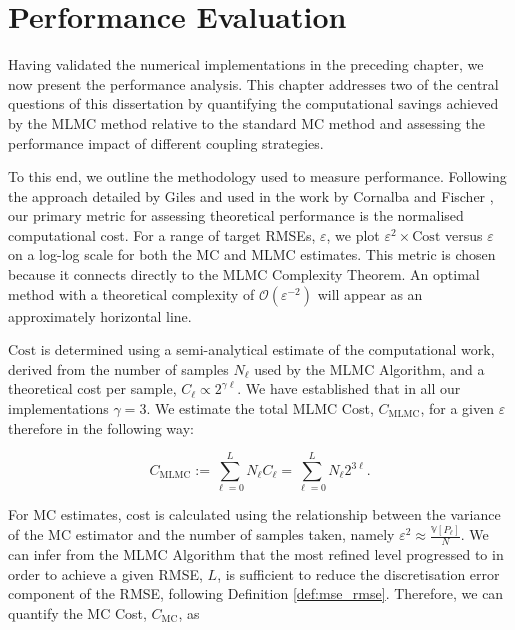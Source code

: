 \chapter{Performance Evaluation}\label{chap:performance}

Having validated the numerical implementations in the preceding chapter, 
we now present the performance analysis. This chapter addresses 
two of the central questions of this dissertation by quantifying 
the computational savings achieved by the MLMC method relative to the 
standard MC method and assessing the performance 
impact of different coupling strategies.

To this end, we outline the methodology used to measure 
performance. Following the approach detailed by Giles \cite{giles2015multilevel}
and used in the work by Cornalba 
and Fischer \cite{cornalba2025multilevel}, our primary metric for assessing 
theoretical performance is the normalised computational cost. For a range of 
target RMSEs, $\varepsilon$, we plot $\varepsilon^2 \times \mathrm{Cost}$
versus $\varepsilon$ on a log-log scale for both the MC and MLMC estimates. 
This metric is chosen because it 
connects directly to the MLMC Complexity Theorem. An optimal method 
with a theoretical complexity of $\mathcal{O}(\varepsilon^{-2})$ 
will appear as an approximately horizontal line.

$\mathrm{Cost}$ is determined using a semi-analytical estimate of the computational
work, derived from the number of samples $N_\ell$ used by the 
MLMC Algorithm, and a theoretical cost per sample, $C_\ell \propto 2^{\gamma \ell}$.
We have established that in all our implementations $\gamma = 3$.
We estimate the total MLMC Cost, $C_{\mathrm{MLMC}}$, for a given 
$\varepsilon$ therefore in the following way:

\begin{equation*}
    C_{\mathrm{MLMC}} := \sum_{\ell = 0}^L N_\ell C_\ell = \sum_{\ell = 0}^L N_\ell 2^{3\ell}.
\end{equation*}

For MC estimates, cost is calculated using the relationship between the
variance of the MC estimator and the number of samples taken, namely
$\varepsilon^2 \approx \frac{\mathbb{V}[P_\ell]}{N}$. We can infer 
from the MLMC Algorithm that the most refined level progressed to in order 
to achieve a given RMSE, $L$, 
is sufficient to reduce the discretisation error component of the RMSE, 
following Definition \ref{def:mse_rmse}. Therefore, we can quantify 
the MC Cost, $C_{\mathrm{MC}}$, as

